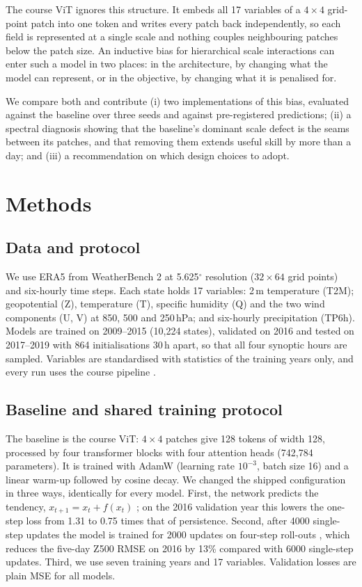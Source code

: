 \documentclass{article}
\begin{document}
The course ViT ignores this structure. It embeds all 17 variables of a $4\times4$ grid-point patch into one token and writes every patch back independently, so each field is represented at a single scale and nothing couples neighbouring patches below the patch size. An inductive bias for hierarchical scale interactions can enter such a model in two places: in the architecture, by changing what the model can represent, or in the objective, by changing what it is penalised for.

We compare both and contribute (i) two implementations of this bias, evaluated against the baseline over three seeds and against pre-registered predictions; (ii) a spectral diagnosis showing that the baseline's dominant scale defect is the seams between its patches, and that removing them extends useful skill by more than a day; and (iii) a recommendation on which design choices to adopt.

\section{Methods}
\label{sec:methods}

\subsection{Data and protocol}
We use ERA5 \cite{hersbach2020era5} from WeatherBench 2 \cite{rasp2020weatherbench, rasp2024weatherbench2} at 5.625$^\circ$ resolution ($32\times64$ grid points) and six-hourly time steps. Each state holds 17 variables: 2\,m temperature (T2M); geopotential (Z), temperature (T), specific humidity (Q) and the two wind components (U, V) at 850, 500 and 250\,hPa; and six-hourly precipitation (TP6h). Models are trained on 2009--2015 (10,224 states), validated on 2016 and tested on 2017--2019 with 864 initialisations 30\,h apart, so that all four synoptic hours are sampled. Variables are standardised with statistics of the training years only, and every run uses the course pipeline \cite{thuemmel2026dlwplabs}.

\subsection{Baseline and shared training protocol}
The baseline is the course ViT: $4\times4$ patches give 128 tokens of width 128, processed by four transformer blocks with four attention heads (742,784 parameters). It is trained with AdamW (learning rate $10^{-3}$, batch size 16) and a linear warm-up followed by cosine decay. We changed the shipped configuration in three ways, identically for every model. First, the network predicts the tendency, $x_{t+1} = x_t + f(x_t)$ \cite{he2016resnet, lam2023graphcast}; on the 2016 validation year this lowers the one-step loss from 1.31 to 0.75 times that of persistence. Second, after 4000 single-step updates the model is trained for 2000 updates on four-step roll-outs \cite{lam2023graphcast, keisler2022gnn}, which reduces the five-day Z500 RMSE on 2016 by 13\% compared with 6000 single-step updates. Third, we use seven training years and 17 variables. Validation losses are plain MSE for all models.
\end{document}
